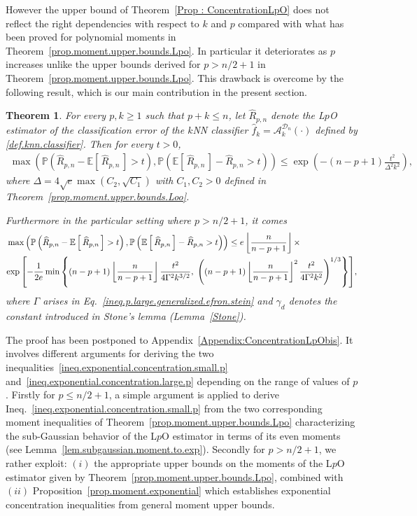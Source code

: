 \documentclass[twoside,11pt]{article}
\numberwithin{equation}{section}
\newcommand{\prob}[1]{\mathbb{P}\left(#1 \right)}
\newcommand{\gp}[1]{\left(#1\right)}
\newcommand{\gc}[1]{\left[#1\right]}
\newcommand{\floor}[1]{\left\lfloor #1 \right\rfloor}
\newcommand{\1}{\mathds{1}}%
\newcommand{\paren}[1]{\left( #1 \right)}
\newcommand{\croch}[1]{\left[\, #1 \,\right]}
\newcommand{\acc}[1]{\left\{ #1 \right\}}
\newcommand{\E}{\mathbb{E}}
\newcommand{\Rh}{\widehat{R}}
\newcommand{\Dn}{\mathcal{D}_n}
\newcommand{\A}{\mathcal{A}}
\numberwithin{equation}{section}
\theoremstyle{plain}
\newtheorem{thm}{Theorem}[section]
\begin{document}
However the upper bound of Theorem~\ref{Prop : ConcentrationLpO} does not reflect the right dependencies with respect to $k$ and $p$ compared with what has been proved for polynomial moments in Theorem~\ref{prop.moment.upper.bounds.Lpo}.
%
In particular it deteriorates as $p$ increases unlike the upper bounds derived for $p>n/2+1$ in Theorem~\ref{prop.moment.upper.bounds.Lpo}.
%
This drawback is overcome by the following result, which is our main contribution in the present section.
%
\begin{thm}\label{Prop : ConcentrationLpO:bis}
%
For every $p,k\geq 1$ such that  $p+k \leq n$, let $\Rh_{p,n}$ denote the L$p$O estimator of the classification error of the $k$NN classifier $\hat f_k=\A_k^{\Dn}(\cdot)$ defined by \eqref{def.knn.classifier}.
%
Then for every $t>0$,
\begin{align}\label{ineq.exponential.concentration.small.p}
%
\max\paren{\prob{ \Rh_{p,n} - \E\croch{\Rh_{p,n}} >t }   , \prob{ \E\croch{\Rh_{p,n}} - \Rh_{p,n} >t } }  \leq   \exp\paren{- (n-p+1) \frac{t^2}{\Delta^2 k^2} } ,
\end{align}
where $\Delta = 4\sqrt{e}\max\paren{ C_2,\sqrt{C_1} }$ with $C_1,C_2>0$ defined in Theorem~\ref{prop.moment.upper.bounds.Loo}.

Furthermore in the particular setting where $p>n/2+1$, it comes
%
\begin{align}
& \max\paren{ \prob{ \Rh_{p,n} - \E\croch{\Rh_{p,n}} >t } ,  \prob{ \E\croch{\Rh_{p,n}} - \Rh_{p,n} >t }} \leq e \floor{\frac{n}{n-p+1}} \times \nonumber \\
&{\small  \exp\gc{- \frac{1}{2e} \min\acc{  \paren{n-p+1}\floor{\frac{n}{n-p+1}}\frac{t^2 }{4\Gamma^2 k^{3/2}}  , \  \gp{ (n-p+1) \floor{\frac{n}{n-p+1}}^2\frac{ t^2}{4\Gamma^2k^2} }^{1/3} }  }  } , \hfill \label{ineq.exponential.concentration.large.p}
\end{align}
where $\Gamma$ arises in Eq.~\eqref{ineq.p.large.generalized.efron.stein} and $\gamma_d$ denotes the constant introduced in Stone's lemma (Lemma~\ref{Stone}).
\end{thm}
%
The proof has been postponed to Appendix~\ref{Appendix:ConcentrationLpObis}. It involves different arguments for deriving the two inequalities~\eqref{ineq.exponential.concentration.small.p} and~\eqref{ineq.exponential.concentration.large.p} depending on the range of values of $p$.
%
Firstly for $p\leq n/2+1$, a simple argument is applied to derive Ineq.~\eqref{ineq.exponential.concentration.small.p} from the two corresponding moment inequalities of Theorem~\ref{prop.moment.upper.bounds.Lpo} characterizing the sub-Gaussian behavior of the L$p$O estimator in terms of its even moments (see Lemma~\ref{lem.subgaussian.moment.to.exp}).
%
Secondly for $p>n/2+1$, we rather exploit: $(i)$ the appropriate upper bounds on the moments of the L$p$O estimator given by Theorem~\ref{prop.moment.upper.bounds.Lpo}, combined with $(ii)$ Proposition~\ref{prop.moment.exponential} which establishes exponential concentration inequalities from general moment upper bounds.
%
\end{document}
